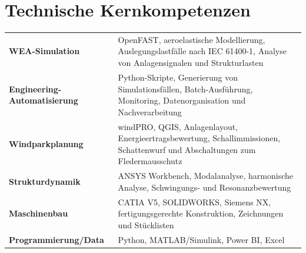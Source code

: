\documentclass[10pt,a4paper]{article}
\begin{document}
\section{Technische Kernkompetenzen}
\begin{tabularx}{\linewidth}
{@{}>{\raggedright\arraybackslash}p{4.5cm}X@{}}
\textbf{WEA-Simulation} & OpenFAST, aeroelastische Modellierung, Auslegungslastfälle nach IEC 61400-1, Analyse von Anlagensignalen und Strukturlasten\\[2pt]
\textbf{Engineering-Automatisierung} & Python-Skripte, Generierung von Simulationsfällen, Batch-Ausführung, Monitoring, Datenorganisation und Nachverarbeitung\\[2pt]
\textbf{Windparkplanung} & windPRO, QGIS, Anlagenlayout, Energieertragsbewertung, Schallimmissionen, Schattenwurf und Abschaltungen zum Fledermausschutz\\[2pt]
\textbf{Strukturdynamik} & ANSYS Workbench, Modalanalyse, harmonische Analyse, Schwingungs- und Resonanzbewertung\\[2pt]
\textbf{Maschinenbau} & CATIA V5, SOLIDWORKS, Siemens NX, fertigungsgerechte Konstruktion, Zeichnungen und Stücklisten\\[2pt]
\textbf{Programmierung/Data} & Python, MATLAB/Simulink, Power BI, Excel
\end{tabularx}
\end{document}
